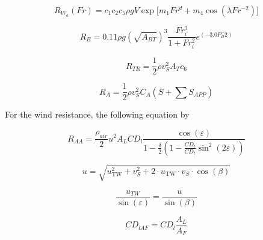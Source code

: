 \documentclass[]{interact}
\theoremstyle{plain}%
\theoremstyle{definition}
\theoremstyle{remark}
\begin{document}
\begin{equation}\label{eqn:R_w_low}
  R_{W_a}(Fr) = c_1 c_2 c_5 \rho g V  \exp \biggl[ m_1 Fr^d + m_4 \cos(\lambda Fr ^{-2}) \biggr]
\end{equation}

\begin{equation}
  \label{eqn:Rbulb}
  R_B = 0.11 \rho g (\sqrt{A_{BT}})^3 \frac{Fr_{i}^3}{1+Fr_{i}^2}e^{(-3.0P_B^-2)}
\end{equation}

\begin{equation}
  \label{eqn:R_transom}
  R_{TR} = \frac{1}{2}\rho v_S^2 A_T c_6
\end{equation}

\begin{equation}
  \label{eqn:R_a}
  R_A = \frac{1}{2}\rho v_S^2 C_A (S+\sum S_{APP})
\end{equation}

For the wind resistance, the following equation by \citet{Blendermann.1994}

\begin{equation}
  \label{eqn:Raa_blendermann}
  R_{AA} = \frac{\rho_{air}}{2}u^2A_{L}CD_l \frac{\cos{(\varepsilon)}}{1-\frac{\delta}{2}(1-\frac{CD_l}{CD_t}\sin^2{(2\varepsilon)})}
\end{equation}

\begin{equation}
  \label{eqn:u_AW}
  u = \sqrt{u_{\text{TW}}^2 + v_S^2 + 2 \cdot u_{\text{TW}} \cdot v_S \cdot \cos(\beta)}
\end{equation}

\begin{equation}
  \label{eqn:epsilon_AWA}
  \frac{u_{TW}}{\sin(\varepsilon)} = \frac{u}{\sin({\beta})}
\end{equation}

\begin{equation}
  \label{eqn:CDlaf}
  CD_{lAF} = CD_l \frac{A_L}{A_F}
\end{equation}
\end{document}
